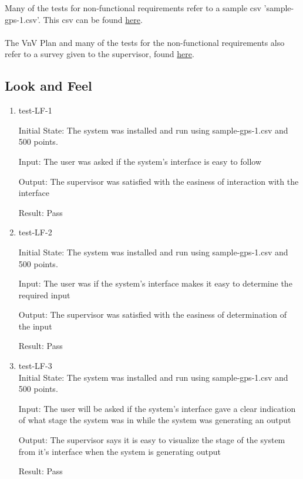 \documentclass[12pt, titlepage]{article}
\begin{document}
Many of the tests for non-functional requirements refer to a sample csv 'sample-gps-1.csv'. This csv can be found \href{https://github.com/paezha/PyERT-BLACK/blob/main/quarto-example/data/sample-gps/sample-gps-1.csv}{here}.
\\ \\
The VnV Plan and many of the tests for the non-functional requirements also refer to a survey given to the supervisor, found \href{https://forms.gle/aJaBmjKrMnpH48Kb7}{here}.

\subsection{Look and Feel}
\begin{enumerate}

\item{test-LF-1} \label{test-LF-1}

Initial State: The system was installed and run using sample-gps-1.csv and 500 points.

Input: The user was asked if the system’s interface is easy to follow

Output: The supervisor was satisfied with the easiness of interaction with the interface

Result: Pass

\item{test-LF-2} \label{test-LF-2}

Initial State: The system was installed and run using sample-gps-1.csv and 500 points.

Input: The user was if the system’s interface makes it easy to
determine the required input

Output: The supervisor was satisfied with the easiness of determination of the input

Result: Pass

\item{test-LF-3\\} \label{test-LF-3}
Initial State: The system was installed and run using sample-gps-1.csv and 500 points.

Input: The user will be asked if the system’s interface gave a clear indication of what stage the system was in while the system was generating an output

Output: The supervisor says it is easy to visualize the stage of the system from it's interface when the system is generating output

Result: Pass
					
\end{enumerate}
\end{document}
